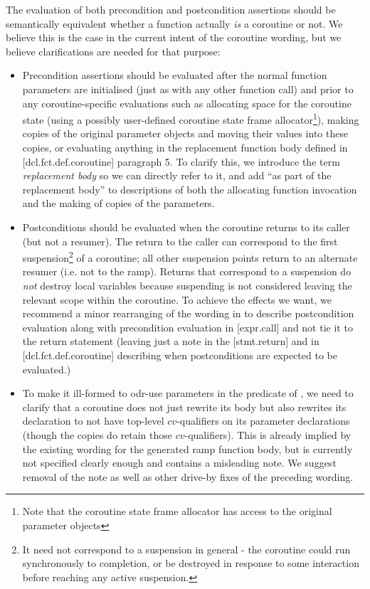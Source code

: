 The evaluation of both precondition and postcondition assertions should be semantically equivalent whether a function actually \emph{is} a coroutine or not.  We believe this is the case in the current intent of the coroutine wording, but we believe clarifications are needed for that purpose:
\begin{itemize}
\item Precondition assertions should be evaluated after the normal function parameters are initialised (just as with any other function call) and prior to any coroutine-specific evaluations such as allocating space for the coroutine state (using a possibly user-defined coroutine state frame allocator\footnote{Note that the coroutine state frame allocator has access to the original parameter objects}), making copies of the original parameter objects and moving their values into these copies, or evaluating anything in the replacement function body defined in [dcl.fct.def.coroutine] paragraph 5.  To clarify this, we  introduce the term \emph{replacement body} so we can directly refer to it, and add ``as part of the replacement body'' to descriptions of both the allocating function invocation and the making of copies of the parameters.
\item Postconditions should be evaluated when the coroutine returns to its caller (but not a resumer).  The return to the caller can correspond to the first suspension\footnote{It need not correspond to a suspension in general - the coroutine could run synchronously to completion, or be destroyed in response to some interaction before reaching any active suspension.} of a coroutine; all other suspension points return to an alternate resumer (i.e. not to the ramp).   Returns that correspond to a suspension do \emph{not} destroy local variables because suspending is not considered leaving the relevant scope within the coroutine.   To achieve the effects we want, we recommend a minor rearranging of the wording in \cite{P2900R8} to describe postcondition evaluation along with precondition evaluation in [expr.call] and not tie it to the return statement (leaving just a note in the [stmt.return] and in [dcl.fct.def.coroutine] describing when postconditions are expected to be evaluated.)
\item To make it ill-formed to odr-use parameters in the predicate of , we need to clarify that a coroutine does not just rewrite its body but also rewrites its declaration to not have top-level $cv$-qualifiers on its parameter declarations (though the copies do retain those $cv$-qualifiers).  This is already implied by the existing wording for the generated ramp function body, but is currently not specified clearly enough and contains a misleading note. We suggest removal of the note as well as other drive-by fixes of the preceding wording.
\end{itemize}

